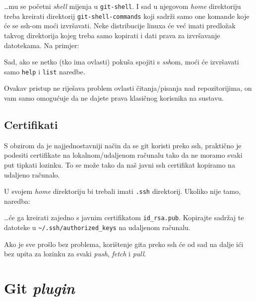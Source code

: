 
\dots{}mu se početni \emph{shell} mijenja u \verb+git-shell+.
I sad u njegovom \emph{home} direktoriju treba kreirati direktorij \verb+git-shell-commands+ koji sadrži samo one komande koje će se ssh-om moći izvršavati.
Neke distribucije linuxa će već imati predložak takvog direktorija kojeg treba samo kopirati i dati prava za izvršavanje datotekama.
Na primjer:


Sad, ako se netko (tko ima ovlasti) pokuša spojiti s \emph{ssh}om, moći će izvršavati samo \verb+help+ i \verb+list+ naredbe.

Ovakav pristup ne riješava problem ovlasti čitanja/pisanja nad repozitorijima, on vam samo omogućuje da ne dajete prava klasičnog korisnika na sustavu.

\subsection*{Certifikati}

S obzirom da je najjednostavniji način da se git koristi preko ssh, praktično je podesiti certifikate na lokalnom/udaljenom računalu tako da ne moramo svaki put tipkati lozinku.
To se može tako da naš javni ssh certifikat kopiramo na udaljeno računalo.

U svojem \emph{home} direktoriju bi trebali imati \verb+.ssh+ direktorij.
Ukoliko nije tamo, naredba:


\dots{}će ga kreirati zajedno s javnim certifikatom \verb+id_rsa.pub+.
Kopirajte sadržaj te datoteke u \verb+~/.ssh/authorized_keys+ na udaljenom računalu.

Ako je sve prošlo bez problema, korištenje gita preko ssh će od sad na dalje ići bez upita za lozinku za svaki \emph{push}, \emph{fetch} i \emph{pull}.

\section*{Git \emph{plugin}}

